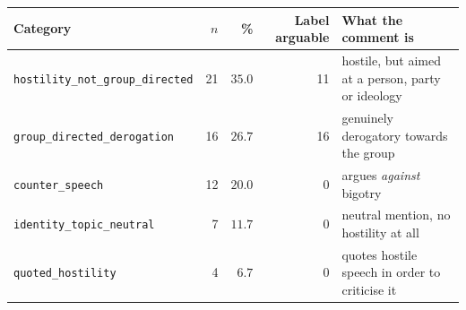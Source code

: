 \begin{tabular}{lrrrl}
\toprule
Category & $n$ & \% & Label arguable & What the comment is \\
\midrule
\texttt{hostility\_not\_group\_directed} & 21 & $35.0$ & 11 & hostile, but aimed at a person, party or ideology \\
\texttt{group\_directed\_derogation} & 16 & $26.7$ & 16 & genuinely derogatory towards the group \\
\texttt{counter\_speech} & 12 & $20.0$ & 0 & argues \emph{against} bigotry \\
\texttt{identity\_topic\_neutral} & 7 & $11.7$ & 0 & neutral mention, no hostility at all \\
\texttt{quoted\_hostility} & 4 & $6.7$ & 0 & quotes hostile speech in order to criticise it \\
\bottomrule
\end{tabular}
